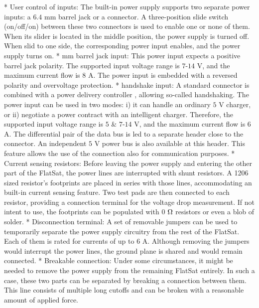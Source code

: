 \begitems
    * {\sbf User control of inputs:} The built-in power supply supports two separate power inputs: a $6.4$ mm barrel jack or a  connector. A three-position slide switch (on/off/on) between these two connectors is used to enable one or none of them. When its slider is located in the middle position, the power supply is turned off. When slid to one side, the corresponding power input enables, and the power supply turns on.
    * { mm barrel jack input:} This power input expects a positive barrel jack polarity. The supported input voltage range is $7$-$14$ V, and the maximum current flow is $8$ A. The power input is embedded with a reversed polarity and overvoltage protection.
    * {\sbf {} handshake input:} A standard  connector is combined with a power delivery controller , allowing so-called handshaking. The power input can be used in two modes: i) it can handle an ordinary $5$ V  charger, or ii) negotiate a power contract with an intelligent  charger. Therefore, the supported input voltage range is $5$ \& $7$-$14$ V, and the maximum current flow is $6$ A.  The differential pair of the  data bus is led to a separate header close to the connector. An independent $5$ V power bus is also available at this header. This feature allows the use of the  connection also for communication purposes.
    * {\sbf Current sensing resistors:} Before leaving the power supply and entering the other part of the FlatSat, the power lines are interrupted with shunt resistors. A 1206 sized  resistor's footprints are placed in series with those lines, accommodating an built-in current sensing feature. Two test pads are then connected to each resistor, providing a connection terminal for the voltage drop measurement. If not intent to use, the footprints can be populated with $0$ $\rm{\Omega}$ resistors or even a blob of solder.
    * {\sbf Disconnection terminal:} A set of removable jumpers can be used to temporarily separate the power supply circuitry from the rest of the FlatSat. Each of them is rated for currents of up to $6$ A. Although removing the jumpers would interrupt the power lines, the ground plane is shared and  would remain connected.
    * {\sbf Breakable connection:} Under some circumstances, it might be needed to remove the power supply from the remaining FlatSat entirely. In such a case, these two parts can be separated by breaking a connection between them. This line consists of multiple long cutoffs and can be broken with a reasonable amount of applied force.
